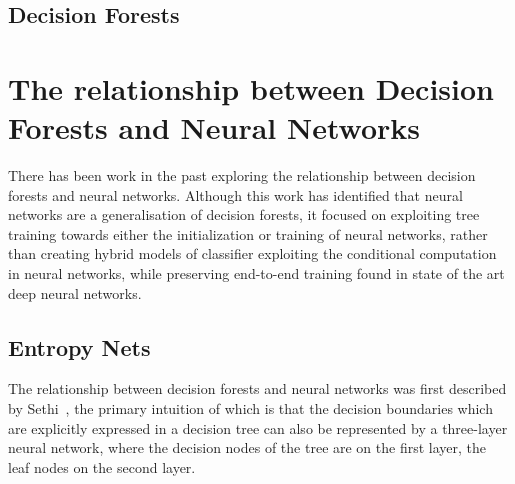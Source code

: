 \documentclass[thesis]{subfiles}
\begin{document}



\subsection{Decision Forests}

\section{The relationship between Decision Forests and Neural Networks}
There has been work in the past exploring the relationship between decision forests and neural networks. Although this work has identified that neural networks are a generalisation of decision forests, it focused on exploiting tree training towards either the initialization or training of neural networks, rather than creating hybrid models of classifier exploiting the conditional computation in neural networks, while preserving end-to-end training found in state of the art deep neural networks.

\subsection{Entropy Nets}
The relationship between decision forests and neural networks was first described by Sethi~\cite{Sethi1990}, the primary intuition of which is that the decision boundaries which are explicitly expressed in a decision tree can also be represented by a three-layer neural network, where the decision nodes of the tree are on the first layer, the leaf nodes on the second layer.
\end{document}
